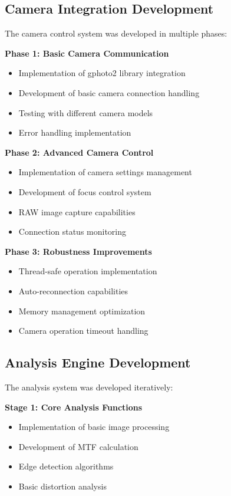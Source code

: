 \subsection{Camera Integration Development}
The camera control system was developed in multiple phases:

\textbf{Phase 1: Basic Camera Communication}
\begin{itemize}
    \item Implementation of gphoto2 library integration
    \item Development of basic camera connection handling
    \item Testing with different camera models
    \item Error handling implementation
\end{itemize}

\textbf{Phase 2: Advanced Camera Control}
\begin{itemize}
    \item Implementation of camera settings management
    \item Development of focus control system
    \item RAW image capture capabilities
    \item Connection status monitoring
\end{itemize}

\textbf{Phase 3: Robustness Improvements}
\begin{itemize}
    \item Thread-safe operation implementation
    \item Auto-reconnection capabilities
    \item Memory management optimization
    \item Camera operation timeout handling
\end{itemize}

\subsection{Analysis Engine Development}
The analysis system was developed iteratively:

\textbf{Stage 1: Core Analysis Functions}
\begin{itemize}
    \item Implementation of basic image processing
    \item Development of MTF calculation
    \item Edge detection algorithms
    \item Basic distortion analysis
\end{itemize}

